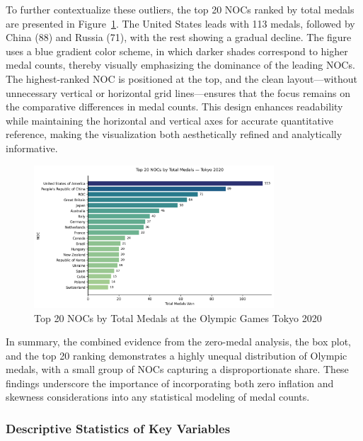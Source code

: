 \documentclass[11pt,twoside]{article}
\numberwithin{Theorem}{section}
\numberwithin{Definition}{section}
\numberwithin{Lemma}{section}
\numberwithin{Algorithm}{section}
\numberwithin{equation}{section}
\begin{document}
To further contextualize these outliers, the top 20 NOCs ranked by total medals are presented in Figure~\ref{fig: Top 20 NOCs by Total Medals at the Olympic Games Tokyo 2020}. The United States leads with 113 medals, followed by China (88) and Russia (71), with the rest showing a gradual decline. The figure uses a blue gradient color scheme, in which darker shades correspond to higher medal counts, thereby visually emphasizing the dominance of the leading NOCs. The highest-ranked NOC is positioned at the top, and the clean layout—without unnecessary vertical or horizontal grid lines—ensures that the focus remains on the comparative differences in medal counts. This design enhances readability while maintaining the horizontal and vertical axes for accurate quantitative reference, making the visualization both aesthetically refined and analytically informative.

\begin{figure}[!ht]
\centering
\includegraphics[width=0.8\textwidth]{top20_total_medals_axes_visible.png}
\caption{Top 20 NOCs by Total Medals at the Olympic Games Tokyo 2020}
\label{fig: Top 20 NOCs by Total Medals at the Olympic Games Tokyo 2020}
\end{figure}

In summary, the combined evidence from the zero-medal analysis, the box plot, and the top 20 ranking demonstrates a highly unequal distribution of Olympic medals, with a small group of NOCs capturing a disproportionate share. These findings underscore the importance of incorporating both zero inflation and skewness considerations into any statistical modeling of medal counts.

\subsubsection{Descriptive Statistics of Key Variables}
\end{document}
